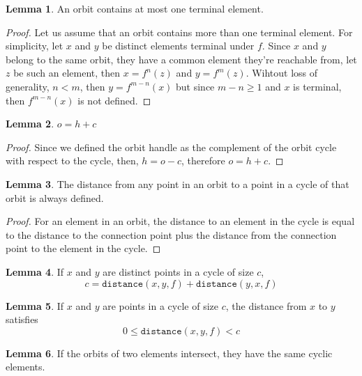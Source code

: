 \documentclass{report}
\theoremstyle{definition}
\newtheorem{lemma}{Lemma}[chapter]
\theoremstyle{remark}
\begin{document}
\begin{lemma}
	An orbit contains at most one terminal element.
\end{lemma}

\begin{proof}
	Let us assume that an orbit contains more than one terminal element.
	For simplicity, let $x$ and $y$ be distinct elements terminal under
	$f$. Since $x$ and $y$ belong to the same orbit, they have a common
	element they're reachable from, let $z$ be such an element, then $x =
	f^n(z)$ and $y = f^m(z)$. Wihtout loss of generality, $n < m$, then $y
	= f^{m - n}(x)$ but since $m - n \geq 1$ and $x$ is terminal, then
	$f^{m - n}(x)$ is not defined.
\end{proof}

\begin{lemma}
	$o = h + c$
\end{lemma}

\begin{proof}
	Since we defined the orbit handle as the complement of the orbit cycle
	with respect to the cycle, then, $h = o - c$, therefore $o = h + c$.
\end{proof}

\begin{lemma}
	The distance from any point in an orbit to a point in a cycle of that
	orbit is always defined.
\end{lemma}

\begin{proof}
	For an element in an orbit, the distance to an element in the cycle
	is equal to the distance to the connection point plus the distance from
	the connection point to the element in the cycle.
\end{proof}

\begin{lemma}
	If $x$ and $y$ are distinct points in a cycle of size $c$,
	\[ c = \mathtt{distance}(x, y, f) + \mathtt{distance}(y, x, f) \]
\end{lemma}

\begin{lemma}
	If $x$ and $y$ are points in a cycle of size $c$, the distance from $x$
	to $y$ satisfies
	\[ 0 \leq \mathtt{distance}(x, y, f) < c \]
\end{lemma}

\begin{lemma}
	If the orbits of two elements intersect, they have the same cyclic
	elements.
\end{lemma}
\end{document}
